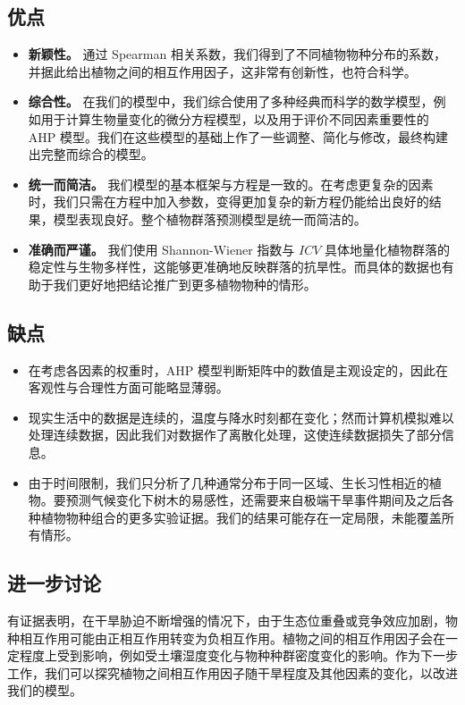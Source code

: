 \documentclass[11pt,a4paper]{ctexart}
\begin{document}
\subsection{优点}

\begin{itemize}
\item \textbf{新颖性。} 通过 Spearman 相关系数，我们得到了不同植物物种分布的系数，并据此给出植物之间的相互作用因子，这非常有创新性，也符合科学。
\item \textbf{综合性。} 在我们的模型中，我们综合使用了多种经典而科学的数学模型，例如用于计算生物量变化的微分方程模型，以及用于评价不同因素重要性的 AHP 模型。我们在这些模型的基础上作了一些调整、简化与修改，最终构建出完整而综合的模型。
\item \textbf{统一而简洁。} 我们模型的基本框架与方程是一致的。在考虑更复杂的因素时，我们只需在方程中加入参数，变得更加复杂的新方程仍能给出良好的结果，模型表现良好。整个植物群落预测模型是统一而简洁的。
\item \textbf{准确而严谨。} 我们使用 Shannon-Wiener 指数与 $ICV$ 具体地量化植物群落的稳定性与生物多样性，这能够更准确地反映群落的抗旱性。而具体的数据也有助于我们更好地把结论推广到更多植物物种的情形。
\end{itemize}

\subsection{缺点}

\begin{itemize}
\item 在考虑各因素的权重时，AHP 模型判断矩阵中的数值是主观设定的，因此在客观性与合理性方面可能略显薄弱。
\item 现实生活中的数据是连续的，温度与降水时刻都在变化；然而计算机模拟难以处理连续数据，因此我们对数据作了离散化处理，这使连续数据损失了部分信息。
\item 由于时间限制，我们只分析了几种通常分布于同一区域、生长习性相近的植物。要预测气候变化下树木的易感性，还需要来自极端干旱事件期间及之后各种植物物种组合的更多实验证据。我们的结果可能存在一定局限，未能覆盖所有情形。
\end{itemize}

\subsection{进一步讨论}

有证据表明，在干旱胁迫不断增强的情况下，由于生态位重叠或竞争效应加剧，物种相互作用可能由正相互作用转变为负相互作用\cite{ref2}。植物之间的相互作用因子会在一定程度上受到影响，例如受土壤湿度变化与物种种群密度变化的影响。作为下一步工作，我们可以探究植物之间相互作用因子随干旱程度及其他因素的变化，以改进我们的模型。
\end{document}
